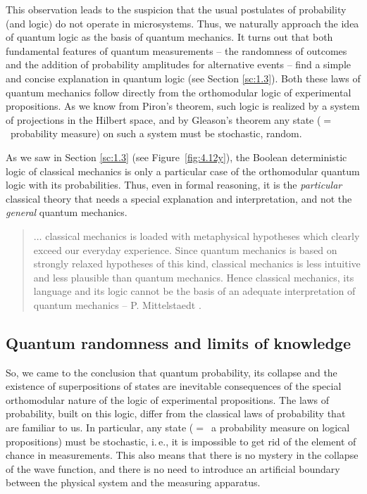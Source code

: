 \documentclass[nochecklpage]{stefan1}
\theoremstyle{definition}
\begin{document}
This observation leads to the suspicion that the usual postulates of
probability (and logic) do not operate in microsystems. Thus, we
naturally approach the idea of quantum logic as the basis of quantum
mechanics. It turns out that both fundamental features of quantum
measurements -- the randomness of outcomes and the addition of
probability amplitudes for alternative events -- find a simple and
concise explanation in quantum logic (see Section \ref{sc:1.3}). Both
these laws of quantum mechanics follow directly from the orthomodular
logic of experimental propositions. As we know from Piron's theorem,
such logic is realized by a system of projections in the Hilbert space,
and by Gleason's theorem any state ($=$~probability measure) on such a
system must be stochastic, random.

As we saw in Section \ref{sc:1.3} (see Figure~\ref{fig:4.12y}), the
Boolean deterministic logic of classical mechanics is only a particular
case of the orthomodular quantum logic with its probabilities. Thus,
even in formal reasoning, it is the \emph{particular} classical theory that
needs a special explanation and interpretation, and not the
\emph{general} quantum mechanics.
%
\begin{quote}
$\ldots$ classical mechanics is loaded with metaphysical hypotheses which
clearly exceed our everyday experience. Since quantum mechanics is based
on strongly relaxed hypotheses of this kind, classical mechanics is less
intuitive and less plausible than quantum mechanics. Hence classical
mechanics, its language and its logic cannot be the basis of an adequate
interpretation of quantum mechanics -- P. Mittelstaedt
\cite{Mittelstaedt}.
\end{quote}

\subsection{Quantum randomness and limits of knowledge}\label{ss:collapse2}
So, we came to the conclusion that quantum probability, its collapse and
the existence of superpositions of states are inevitable consequences
of the special orthomodular nature of the logic of experimental
propositions. The laws of probability, built on this logic, differ from
the classical laws of probability that are familiar to us. In
particular, any state ($=$~a probability measure on logical propositions)
must be stochastic, i.\,e., it is impossible to get rid of the element of
chance in measurements. This also means that there is no mystery in the
collapse of the wave function, and there is no need to introduce an
artificial boundary between the physical system and the measuring
apparatus.
\end{document}
